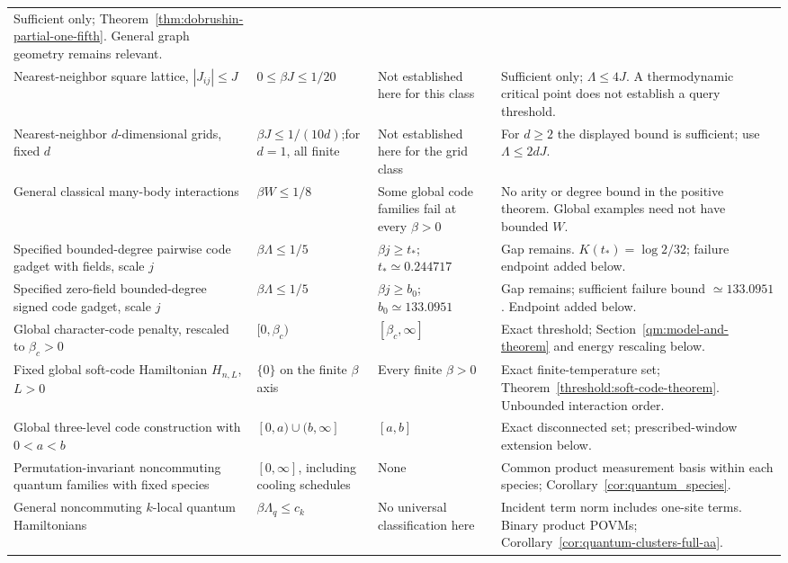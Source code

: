 \begin{longtable}{@{}>{\raggedright\arraybackslash}p{}>{\raggedright\arraybackslash}p{}>{\raggedright\arraybackslash}p{}>{\raggedright\arraybackslash}p{}@{}}
Sufficient only; Theorem~\ref{thm:dobrushin-partial-one-fifth}. General graph geometry remains relevant.\\
\addlinespace
Nearest-neighbor square lattice, $|J_{ij}|\le J$ &
$0\le\beta J\le1/20$ & Not established here for this class &
Sufficient only; $\Lambda\le4J$. A thermodynamic critical point does not establish a query threshold.\\
\addlinespace
Nearest-neighbor $d$-dimensional grids, fixed $d$ &
$\beta J\le1/(10d)$;\newline for $d=1$, all finite &
Not established here for the grid class &
For $d\ge2$ the displayed bound is sufficient; use $\Lambda\le2dJ$.\\
\addlinespace
General classical many-body interactions &
$\beta W\le1/8$ & Some global code families fail at every $\beta>0$ &
No arity or degree bound in the positive theorem. Global examples need not have bounded $W$.\\
\addlinespace
Specified bounded-degree pairwise code gadget with fields, scale $j$ &
$\beta\Lambda\le1/5$ & $\beta j\ge t_*$;\newline $t_*\simeq0.244717$ &
Gap remains. $K(t_*)=\log2/32$; failure endpoint added below.\\
\addlinespace
Specified zero-field bounded-degree signed code gadget, scale $j$ &
$\beta\Lambda\le1/5$ & $\beta j\ge b_0$;\newline $b_0\simeq133.0951$ &
Gap remains; sufficient failure bound $\simeq133.0951$. Endpoint added below.\\
\addlinespace
Global character-code penalty, rescaled to $\beta_c>0$ &
$[0,\beta_c)$ & $[\beta_c,\infty]$ &
Exact threshold; Section~\ref{qm:model-and-theorem} and energy rescaling below.\\
\addlinespace
Fixed global soft-code Hamiltonian $H_{n,L}$, $L>0$ &
$\{0\}$ on the finite $\beta$ axis & Every finite $\beta>0$ &
Exact finite-temperature set; Theorem~\ref{threshold:soft-code-theorem}. Unbounded interaction order.\\
\addlinespace
Global three-level code construction with $0<a<b$ &
$[0,a)\cup(b,\infty]$ & $[a,b]$ &
Exact disconnected set; prescribed-window extension below.\\
\addlinespace
Permutation-invariant noncommuting quantum families with fixed species &
$[0,\infty]$, including cooling schedules & None &
Common product measurement basis within each species; Corollary~\ref{cor:quantum_species}.\\
\addlinespace
General noncommuting $k$-local quantum Hamiltonians &
$\beta\Lambda_q\le c_k$ & No universal classification here &
Incident term norm includes one-site terms. Binary product POVMs; Corollary~\ref{cor:quantum-clusters-full-aa}.\\
\end{longtable}
\endgroup

